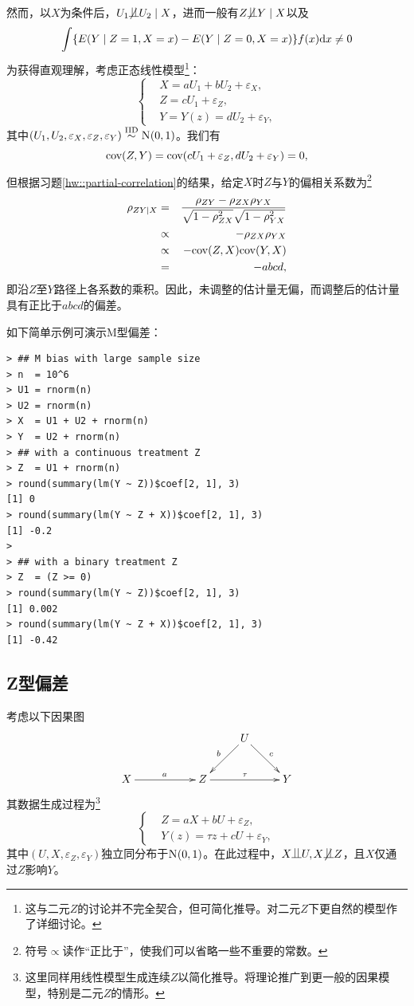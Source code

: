 然而，以$X$为条件后，$U_1\nind  U_2 \mid X$，进而一般有$Z\nind Y\mid X$以及$$
\int \{  E(Y\mid Z=1, X=x) - E(Y\mid Z=0, X=x) \} f(x) \textup{d} x \neq 0
$$为获得直观理解，考虑正态线性模型\footnote{这与二元$Z$的讨论并不完全契合，但可简化推导。\citet{ding2015adjust}对二元$Z$下更自然的模型作了详细讨论。}：$$
\left\{ 
\begin{aligned}
&X = a U_1 + b U_2 +  \varepsilon_X,\\
&Z=   cU_1 +  \varepsilon_Z , \\
&Y=      Y(z) =  dU_2 +  \varepsilon_Y ,
\end{aligned}
\right. 
$$其中$(U_1, U_2, \varepsilon_X, \varepsilon_Z, \varepsilon_Y)  \iidsim \N01$。我们有$$
\textup{cov}(Z,Y) = \textup{cov}(  cU_1 +  \varepsilon_Z,  dU_2 +  \varepsilon_Y) = 0,
$$但根据习题\ref{hw::partial-correlation}的结果，给定$X$时$Z$与$Y$的偏相关系数为\footnote{符号$\propto$读作“正比于”，使我们可以省略一些不重要的常数。}\begin{eqnarray*}
\rho_{ZY\mid X} &=& \frac{   \rho_{ZY} - \rho_{ZX} \rho_{YX}  }{  \sqrt{  1-\rho_{ZX}^2 }  \sqrt{1- \rho_{YX}^2  }  }   
\\
&\propto &  - \rho_{ZX} \rho_{YX}  \\
&\propto &  - \textup{cov}(Z, X) \textup{cov}(Y, X)  \\
&=&  - abcd,
\end{eqnarray*}即沿$Z$至$Y$路径上各系数的乘积。因此，未调整的估计量无偏，而调整后的估计量具有正比于$abcd$的偏差。 


 
 
如下简单示例可演示M型偏差：

\begin{lstlisting}
> ## M bias with large sample size
> n  = 10^6
> U1 = rnorm(n)
> U2 = rnorm(n)
> X  = U1 + U2 + rnorm(n)
> Y  = U2 + rnorm(n)
> ## with a continuous treatment Z
> Z  = U1 + rnorm(n)
> round(summary(lm(Y ~ Z))$coef[2, 1], 3)
[1] 0
> round(summary(lm(Y ~ Z + X))$coef[2, 1], 3)
[1] -0.2
> 
> ## with a binary treatment Z
> Z  = (Z >= 0)
> round(summary(lm(Y ~ Z))$coef[2, 1], 3)
[1] 0.002
> round(summary(lm(Y ~ Z + X))$coef[2, 1], 3)
[1] -0.42
\end{lstlisting}



\subsection{Z型偏差}
\label{sec::z-bias}

 

考虑以下因果图$$
\xymatrix{
&&&U \ar[dl]_b \ar[dr]^c \\
X \ar[rr]^a &&Z\ar[rr]^\tau   && Y 
}
$$其数据生成过程为\footnote{这里同样用线性模型生成连续$Z$以简化推导。\citet{ding2017instrumental}将理论推广到更一般的因果模型，特别是二元$Z$的情形。}$$
\left\{ 
\begin{aligned}
&Z=   aX + bU +   \varepsilon_Z , \\
&Y(z)=   \tau z + cU +  \varepsilon_Y ,
\end{aligned}
\right. 
$$其中$(U, X, \varepsilon_Z, \varepsilon_Y) $独立同分布于$ \N01$。在此过程中，$X\ind U,$$X\nind Z$，且$X$仅通过$Z$影响$Y$。  

